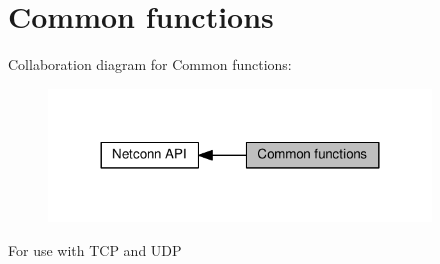 \hypertarget{group__netconn__common}{}\section{Common functions}
\label{group__netconn__common}
Collaboration diagram for Common functions\+:
\nopagebreak
\begin{figure}[H]
\begin{center}
\leavevmode
\includegraphics[width=288pt]{group__netconn__common}
\end{center}
\end{figure}
For use with T\+CP and U\+DP 